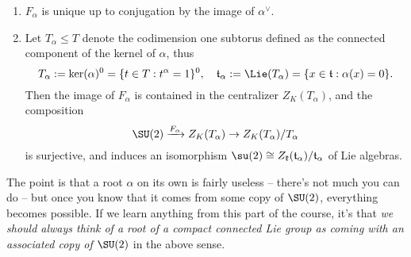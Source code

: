 \documentclass[reqno]{amsart} 
\begin{document}
\begin{theorem}
\begin{enumerate}
  \item $F_\alpha$ is unique up to conjugation by the image of $\alpha^\vee$.
  \item \label{item:image-F-alpha} Let $T_\alpha \leq T$ denote the codimension one subtorus defined as the connected component of the kernel of $\alpha$, thus
    \begin{equation*}
      T_\alpha := \ker(\alpha)^0 = \{t \in T : t^\alpha = 1\}^0, \quad \mathfrak{t}_\alpha := \Lie(T_\alpha) = \{x \in \mathfrak{t} : \alpha(x) = 0\}.
    \end{equation*}
    Then the image of $F_\alpha$ is contained in the centralizer $Z_K(T_\alpha)$, and the composition
    \begin{equation}\label{eq:}
      \SU(2) \xrightarrow{F_\alpha } Z_K(T_\alpha)
      \rightarrow Z_K(T_\alpha)/T_\alpha
    \end{equation}
    is surjective, and induces an isomorphism $\su(2) \cong Z_{\mathfrak{k}}(\mathfrak{t}_\alpha) / \mathfrak{t}_\alpha$ of Lie algebras.
  \end{enumerate}
\end{theorem}

The point is that a root $\alpha$ on its own is fairly useless -- there's not much you can do -- but once you know that it comes from some copy of $\SU(2)$, everything becomes possible.  If we learn anything from this part of the course, it's that \emph{we should always think of a root of a compact connected Lie group as coming with an associated copy of $\SU(2)$} in the above sense.
\end{document}
